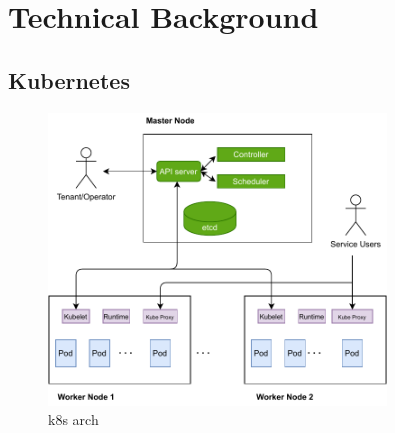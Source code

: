 \chapter{Technical Background}
\label{sec:state}







\section{Kubernetes}
\begin{figure}[H]
    \centering
    \includegraphics[width=0.8\textwidth]{images/k8s_arch.pdf}
    \caption[k8s arch]{k8s arch}
    \label{fig:k8s_arch}
  \end{figure}


